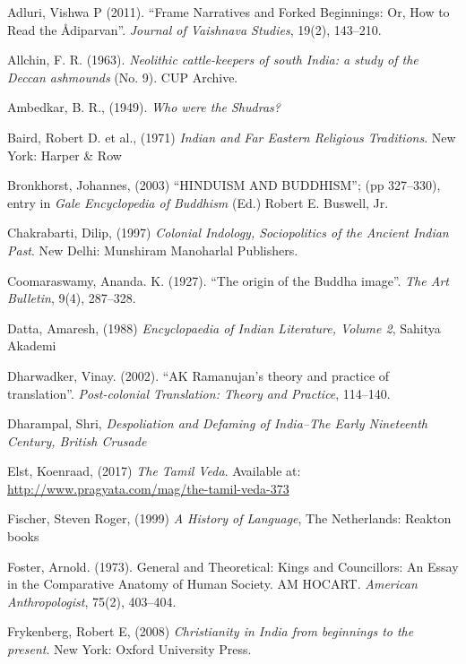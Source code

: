 \begin{thebibliography}{99}
 Adluri, Vishwa P (2011). “Frame Narratives and Forked Beginnings: Or, How to Read the Ådiparvan”. \textit{Journal of Vaishnava Studies}, 19(2), 143–210.

  Allchin, F. R. (1963). \textit{Neolithic cattle-keepers of south India: a study of the Deccan ashmounds} (No. 9). CUP Archive.

  Ambedkar, B. R., (1949). \textit{Who were the Shudras?}

  Baird, Robert D. et al., (1971) \textit{Indian and Far Eastern Religious Traditions}. New York: Harper \& Row

  Bronkhorst, Johannes, (2003) “HINDUISM AND BUDDHISM”; (pp 327–330), entry in \textit{Gale Encyclopedia of Buddhism} (Ed.) Robert E. Buswell, Jr.

  Chakrabarti, Dilip, (1997) \textit{Colonial Indology, Sociopolitics of the Ancient Indian Past}. New Delhi: Munshiram Manoharlal Publishers.

  Coomaraswamy, Ananda. K. (1927). “The origin of the Buddha image”. \textit{The Art Bulletin}, 9(4), 287–328.

  Datta, Amaresh, (1988) \textit{Encyclopaedia of Indian Literature, Volume 2}, Sahitya Akademi

  Dharwadker, Vinay. (2002). “AK Ramanujan’s theory and practice of translation”. \textit{Post-colonial Translation: Theory and Practice}, 114–140.

  Dharampal, Shri, \textit{Despoliation and Defaming of India–The Early Nineteenth Century, British Crusade}

  Elst, Koenraad, (2017) \textit{The Tamil Veda}. Available at: \url{http://www.pragyata.com/mag/the-tamil-veda-373}

  Fischer, Steven Roger, (1999) \textit{A History of Language}, The Netherlands: Reakton books

  Foster, Arnold. (1973). General and Theoretical: Kings and Councillors: An Essay in the Comparative Anatomy of Human Society. AM HOCART. \textit{American Anthropologist}, 75(2), 403–404.

  Frykenberg, Robert E, (2008) \textit{Christianity in India from beginnings to the present}. New York: Oxford University Press.


\end{thebibliography}
